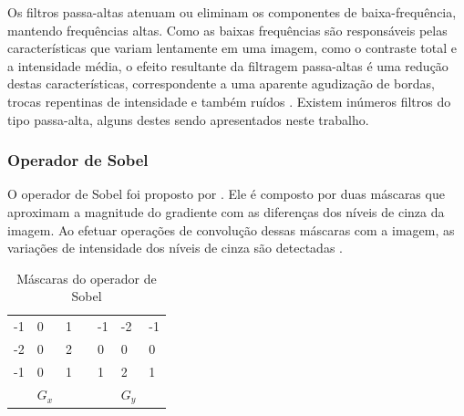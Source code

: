 \documentclass[12pt,oneside,a4paper,english,french,spanish,brazil,]{abntex2}
\begin{document}
Os filtros passa-altas atenuam ou eliminam os componentes de baixa-frequência, mantendo frequências altas. Como as baixas frequências são responsáveis pelas características que variam lentamente em uma imagem, como o contraste total e a intensidade média, o efeito resultante da filtragem passa-altas é uma redução destas características, correspondente a uma aparente agudização de bordas, trocas repentinas de intensidade e também ruídos \cite{gonzalez:2012}. Existem inúmeros filtros do tipo passa-alta, alguns destes sendo apresentados neste trabalho.

\subsubsection{Operador de Sobel}


O operador de Sobel foi proposto por \citet{sobel:1968}. Ele é composto por duas máscaras que aproximam a magnitude do gradiente com as diferenças dos níveis de cinza da imagem. Ao efetuar operações de convolução dessas máscaras com a imagem, as variações de intensidade dos níveis de cinza são detectadas \cite{pedrini:2008}.

\begin{table}[]
\centering
\caption{Máscaras do operador de Sobel}
\label{tab:Sobel}
\begin{tabular}{lllllll}
\cline{1-3} \cline{5-7}
\multicolumn{1}{|l|}{-1} & \multicolumn{1}{l|}{0} & \multicolumn{1}{l|}{1} & \multicolumn{1}{l|}{} & \multicolumn{1}{l|}{-1} & \multicolumn{1}{l|}{-2} & \multicolumn{1}{l|}{-1} \\ \cline{1-3} \cline{5-7} 
\multicolumn{1}{|l|}{-2} & \multicolumn{1}{l|}{0} & \multicolumn{1}{l|}{2} & \multicolumn{1}{l|}{} & \multicolumn{1}{l|}{0}  & \multicolumn{1}{l|}{0}  & \multicolumn{1}{l|}{0}  \\ \cline{1-3} \cline{5-7} 
\multicolumn{1}{|l|}{-1} & \multicolumn{1}{l|}{0} & \multicolumn{1}{l|}{1} & \multicolumn{1}{l|}{} & \multicolumn{1}{l|}{1}  & \multicolumn{1}{l|}{2}  & \multicolumn{1}{l|}{1}  \\ \cline{1-3} \cline{5-7} 
                         & \(G_x\)                   &                        &                       &                         & \(G_y\)                    &                        
\end{tabular}
\end{table}
\end{document}

